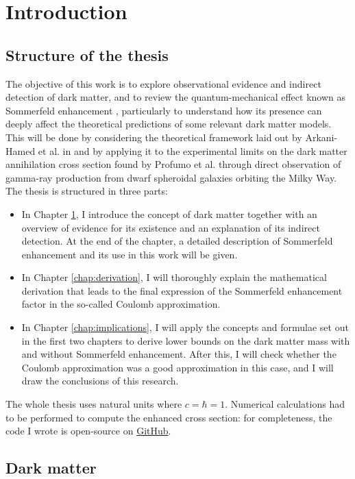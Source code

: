 \chapter{Introduction}\label{chap:introduction}

\section{Structure of the thesis}
The objective of this work is to explore observational evidence and indirect detection of dark matter, and to review the quantum-mechanical effect known as Sommerfeld enhancement \cite{Sommerfeld_1931}, particularly to understand how its presence can deeply affect the theoretical predictions of some relevant dark matter models. This will be done by considering the theoretical framework laid out by Arkani-Hamed et al. in \cite{Arkani_2009} and by applying it to the experimental limits on the dark matter annihilation cross section found by Profumo et al. \cite{Profumo_2018} through direct observation of gamma-ray production from dwarf spheroidal galaxies orbiting the Milky Way. The thesis is structured in three parts:
\begin{itemize}
	\item In Chapter \ref{chap:introduction}, I introduce the concept of dark matter together with an overview of evidence for its existence and an explanation of its indirect detection. At the end of the chapter, a detailed description of Sommerfeld enhancement and its use in this work will be given.
	\item In Chapter \ref{chap:derivation}, I will thoroughly explain the mathematical derivation that leads to the final expression of the Sommerfeld enhancement factor in the so-called Coulomb approximation.
	\item In Chapter \ref{chap:implications}, I will apply the concepts and formulae set out in the first two chapters to derive lower bounds on the dark matter mass with and without Sommerfeld enhancement. After this, I will check whether the Coulomb approximation was a good approximation in this case, and I will draw the conclusions of this research.
\end{itemize}

The whole thesis uses natural units where \(c=\hbar=1\). Numerical calculations had to be performed to compute the enhanced cross section: for completeness, the code I wrote is open-source on \href{https://github.com/LuckeeDev/bachelor-thesis}{GitHub}.

\section{Dark matter}

